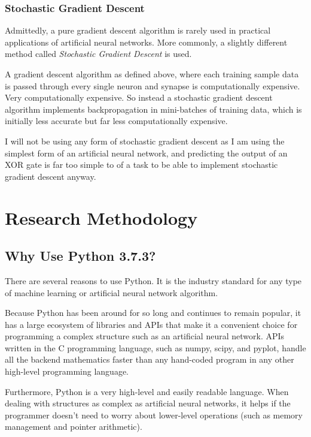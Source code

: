 \documentclass[12pt]{article}
\begin{document}
\subsubsection{Stochastic Gradient Descent}

Admittedly, a pure gradient descent algorithm is rarely used in practical applications of artificial neural networks. More commonly, a slightly different method called \textit{Stochastic Gradient Descent} is used.

A gradient descent algorithm as defined above, where each training sample data is passed through every single neuron and synapse is computationally expensive. Very computationally expensive. So instead a stochastic gradient descent algorithm implements backpropagation in mini-batches of training data, which is initially less accurate but far less computationally expensive.

I will not be using any form of stochastic gradient descent as I am using the simplest form of an artificial neural network, and predicting the output of an XOR gate is far too simple to of a task to be able to implement stochastic gradient descent anyway.

\section{Research Methodology \label{methodology}}


\subsection{Why Use Python 3.7.3?}

There are several reasons to use Python. It is the industry standard for any type of machine learning or artificial neural network algorithm.

Because Python has been around for so long and continues to remain popular, it has a large ecosystem of libraries and APIs that make it a convenient choice for programming a complex structure such as an artificial neural network. APIs written in the C programming language, such as numpy, scipy, and pyplot, handle all the backend mathematics faster than any hand-coded program in any other high-level programming language.

Furthermore, Python is a very high-level and easily readable language. When dealing with structures as complex as artificial neural networks, it helps if the programmer doesn't need to worry about lower-level operations (such as memory management and pointer arithmetic).
\end{document}
